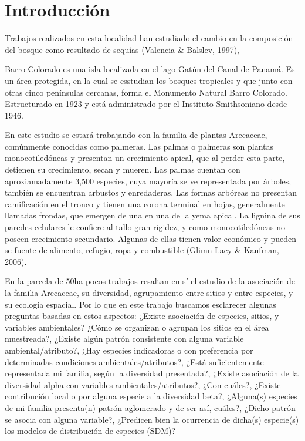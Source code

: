 \documentclass[11pt,]{article}
\begin{document}
\noindent  \section{Introducción}\label{introducciuxf3n}

Trabajos realizados en esta localidad han estudiado el cambio en la
composición del bosque como resultado de sequías (Valencia \& Balslev,
1997),

Barro Colorado es una isla localizada en el lago Gatún del Canal de
Panamá. Es un área protegida, en la cual se esstudian los bosques
tropicales y que junto con otras cinco penínsulas cercanas, forma el
Monumento Natural Barro Colorado. Estructurado en 1923 y está
administrado por el Instituto Smithsoniano desde 1946.

En este estudio se estará trabajando con la familia de plantas
Arecaceae, comúnmente conocidas como palmeras. Las palmas o palmeras son
plantas monocotiledóneas y presentan un crecimiento apical, que al
perder esta parte, detienen su crecimiento, secan y mueren. Las palmas
cuentan con aproxiamadamente 3,500 especies, cuya mayoría se ve
representada por árboles, también se encuentran arbustos y enredaderas.
Las formas arbóreas no presentan ramificación en el tronco y tienen una
corona terminal en hojas, generalmente llamadas frondas, que emergen de
una en una de la yema apical. La lignina de sus paredes celulares le
confiere al tallo gran rigidez, y como monocotiledóneas no poseen
crecimiento secundario. Algunas de ellas tienen valor económico y pueden
se fuente de alimento, refugio, ropa y combustible (Glimn-Lacy \&
Kaufman, 2006).

En la parcela de 50ha pocos trabajos resaltan en sí el estudio de la
asociación de la familia Arecaceae, su diversidad, agrupamiento entre
sitios y entre especies, y su ecología espacial. Por lo que en este
trabajo buscamos esclarecer algunas preguntas basadas en estos aspectos:
¿Existe asociación de especies, sitios, y variables ambientales? ¿Cómo
se organizan o agrupan los sitios en el área muestreada?, ¿Existe algún
patrón consistente con alguna variable ambiental/atributo?, ¿Hay
especies indicadoras o con preferencia por determinadas condiciones
ambientales/atributos?, ¿Está suficientemente representada mi familia,
según la diversidad presentada?, ¿Existe asociación de la diversidad
alpha con variables ambientales/atributos?, ¿Con cuáles?, ¿Existe
contribución local o por alguna especie a la diversidad beta?,
¿Alguna(s) especies de mi familia presenta(n) patrón aglomerado y de ser
así, cuáles?, ¿Dicho patrón se asocia con alguna variable?, ¿Predicen
bien la ocurrencia de dicha(s) especie(s) los modelos de distribución de
especies (SDM)?
\end{document}
